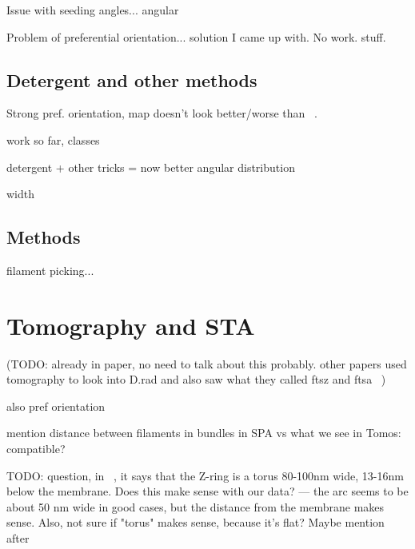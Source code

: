 Issue with seeding angles... angular

Problem of preferential orientation... solution I came up with. No work. stuff.


\subsection{Detergent and other methods}


Strong pref. orientation, map doesn't look better/worse than ~\cite{fujitaStructuresFtsZSingle2023}.

work so far, classes

detergent + other tricks = now better angular distribution

width

\subsection{Methods}

filament picking...

\section{Tomography and STA}

(TODO: already in paper, no need to talk about this probably. other papers used tomography to look into D.rad and also saw what they called ftsz and ftsa ~\cite{sextonSuperresolutionConfocalCryoCLEM2022})

also pref orientation

mention distance between filaments in bundles in SPA vs what we see in Tomos: compatible?

TODO: question, in ~\cite{mcquillenInsightsStructureFunction2020}, it says that the Z-ring is a torus 80-100nm wide, 13-16nm below the membrane. Does this make sense with our data? --- the arc seems to be about 50 nm wide in good cases, but the distance from the membrane makes sense. Also, not sure if "torus" makes sense, because it's flat? Maybe mention after

